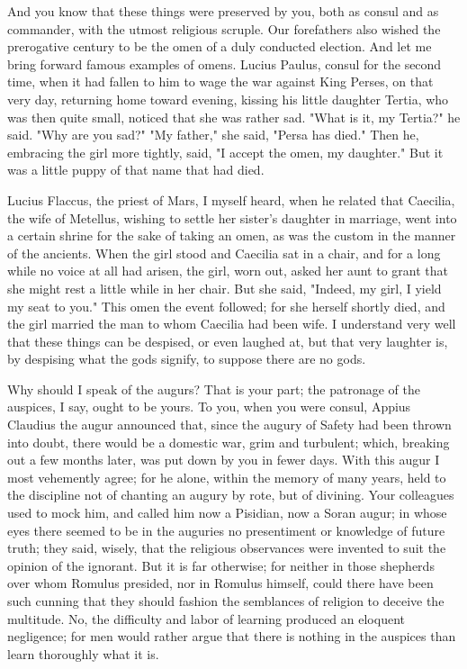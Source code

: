  And you know that these things were preserved by you, both as consul and as commander, with the utmost religious scruple. Our forefathers also wished the prerogative century to be the omen of a duly conducted election. And let me bring forward famous examples of omens. Lucius Paulus, consul for the second time, when it had fallen to him to wage the war against King Perses, on that very day, returning home toward evening, kissing his little daughter Tertia, who was then quite small, noticed that she was rather sad. "What is it, my Tertia?" he said. "Why are you sad?" "My father," she said, "Persa has died." Then he, embracing the girl more tightly, said, "I accept the omen, my daughter." But it was a little puppy of that name that had died.

 Lucius Flaccus, the priest of Mars, I myself heard, when he related that Caecilia, the wife of Metellus, wishing to settle her sister's daughter in marriage, went into a certain shrine for the sake of taking an omen, as was the custom in the manner of the ancients. When the girl stood and Caecilia sat in a chair, and for a long while no voice at all had arisen, the girl, worn out, asked her aunt to grant that she might rest a little while in her chair. But she said, "Indeed, my girl, I yield my seat to you." This omen the event followed; for she herself shortly died, and the girl married the man to whom Caecilia had been wife. I understand very well that these things can be despised, or even laughed at, but that very laughter is, by despising what the gods signify, to suppose there are no gods.

 Why should I speak of the augurs? That is your part; the patronage of the auspices, I say, ought to be yours. To you, when you were consul, Appius Claudius the augur announced that, since the augury of Safety had been thrown into doubt, there would be a domestic war, grim and turbulent; which, breaking out a few months later, was put down by you in fewer days. With this augur I most vehemently agree; for he alone, within the memory of many years, held to the discipline not of chanting an augury by rote, but of divining. Your colleagues used to mock him, and called him now a Pisidian, now a Soran augur; in whose eyes there seemed to be in the auguries no presentiment or knowledge of future truth; they said, wisely, that the religious observances were invented to suit the opinion of the ignorant. But it is far otherwise; for neither in those shepherds over whom Romulus presided, nor in Romulus himself, could there have been such cunning that they should fashion the semblances of religion to deceive the multitude. No, the difficulty and labor of learning produced an eloquent negligence; for men would rather argue that there is nothing in the auspices than learn thoroughly what it is.

